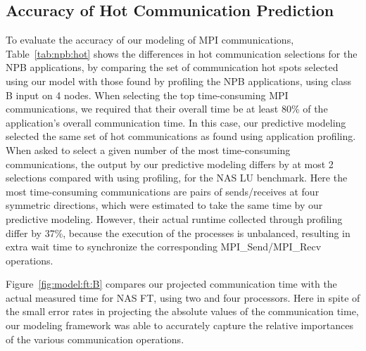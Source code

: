 \subsection{Accuracy of Hot Communication Prediction}

To evaluate the accuracy of our modeling of MPI communications, 
Table~\ref{tab:npb:hot} shows the differences in hot communication selections for the NPB
applications, by comparing the set of communication hot spots selected using our model
with those found by profiling the NPB applications, using class B
input on 4 nodes. 
  When selecting the
top time-consuming MPI communications, we required that their overall
time be at least 80\% of the application's overall communication time.
In this case, our predictive modeling selected the same set of hot
communications as found using application profiling.  When asked to
select a given number of the most time-consuming communications,
the output by our predictive modeling differs by at most 2
selections compared with using profiling, for the NAS LU benchmark.
Here the most time-consuming communications are pairs of
sends/receives at four symmetric directions, which were estimated to
take the same time by our predictive modeling.  However, their actual
runtime collected through profiling differ by 37\%, because the
execution of the processes is unbalanced, resulting in extra wait time
to synchronize the corresponding MPI\_Send/MPI\_Recv operations.

Figure~\ref{fig:model:ft:B} compares our projected communication time
with the actual measured time for NAS FT, using two and four
processors.  Here in spite of the small error rates in projecting the
absolute values of the communication time, our modeling framework was
able to accurately capture the relative importances of the various
communication operations.

